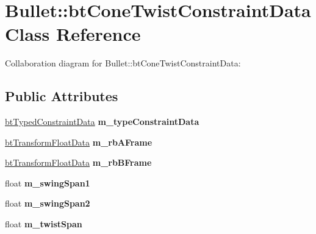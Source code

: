 \hypertarget{class_bullet_1_1bt_cone_twist_constraint_data}{\section{Bullet\+:\+:bt\+Cone\+Twist\+Constraint\+Data Class Reference}
\label{class_bullet_1_1bt_cone_twist_constraint_data}
}


Collaboration diagram for Bullet\+:\+:bt\+Cone\+Twist\+Constraint\+Data\+:
\subsection*{Public Attributes}
\begin{DoxyCompactItemize}
\item 
\hypertarget{class_bullet_1_1bt_cone_twist_constraint_data_ac449408f19f40e9fc018d2ac926413ad}{\hyperlink{class_bullet_1_1bt_typed_constraint_data}{bt\+Typed\+Constraint\+Data} {\bfseries m\+\_\+type\+Constraint\+Data}}\label{class_bullet_1_1bt_cone_twist_constraint_data_ac449408f19f40e9fc018d2ac926413ad}

\item 
\hypertarget{class_bullet_1_1bt_cone_twist_constraint_data_a2c7d959bbef5f5aed941bb337e8587ba}{\hyperlink{class_bullet_1_1bt_transform_float_data}{bt\+Transform\+Float\+Data} {\bfseries m\+\_\+rb\+A\+Frame}}\label{class_bullet_1_1bt_cone_twist_constraint_data_a2c7d959bbef5f5aed941bb337e8587ba}

\item 
\hypertarget{class_bullet_1_1bt_cone_twist_constraint_data_a3e22307fed82c3a1e0c3aaae2dcba153}{\hyperlink{class_bullet_1_1bt_transform_float_data}{bt\+Transform\+Float\+Data} {\bfseries m\+\_\+rb\+B\+Frame}}\label{class_bullet_1_1bt_cone_twist_constraint_data_a3e22307fed82c3a1e0c3aaae2dcba153}

\item 
\hypertarget{class_bullet_1_1bt_cone_twist_constraint_data_acd26094b9d03d1ebed69267404d1bd53}{float {\bfseries m\+\_\+swing\+Span1}}\label{class_bullet_1_1bt_cone_twist_constraint_data_acd26094b9d03d1ebed69267404d1bd53}

\item 
\hypertarget{class_bullet_1_1bt_cone_twist_constraint_data_a7653e5503580a350ca04b154d50c8c96}{float {\bfseries m\+\_\+swing\+Span2}}\label{class_bullet_1_1bt_cone_twist_constraint_data_a7653e5503580a350ca04b154d50c8c96}

\item 
\hypertarget{class_bullet_1_1bt_cone_twist_constraint_data_a171705838521db55dcd3abeb531a3724}{float {\bfseries m\+\_\+twist\+Span}}\label{class_bullet_1_1bt_cone_twist_constraint_data_a171705838521db55dcd3abeb531a3724}


\end{DoxyCompactItemize}

